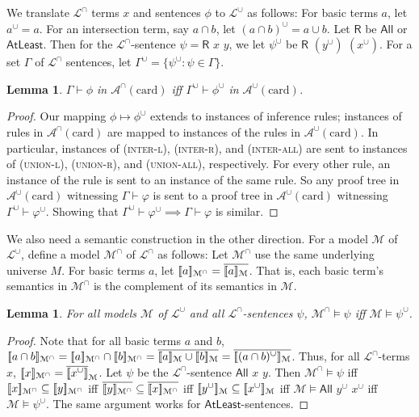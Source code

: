 \documentclass[letterpaper]{article}
\newtheorem{lemma}[theorem]{Lemma}
\theoremstyle{definition}
\newcommand{\semantics}[1]{[\![\mbox{\em $ #1 $\/}]\!]}
\newcommand{\Model}{\mathcal{M}}
\newcommand{\set}[1]{\{ #1 \}}
\newcommand{\proves}{\vdash}
\newcommand{\lang}{\mathcal{L}}
\newcommand{\Aunion}{\mathscr{A}^{\cup}}
\newcommand{\Ainter}{\mathscr{A}^{\cap}}
\newcommand{\proverule}{\textsc}
\newcommand{\unionl}{\proverule{union-l}}
\newcommand{\unionr}{\proverule{union-r}}
\newcommand{\unionall}{\proverule{union-all}}
\newcommand{\interl}{\proverule{inter-l}}
\newcommand{\interr}{\proverule{inter-r}}
\newcommand{\interall}{\proverule{inter-all}}
\newcommand{\All}[2]{\mathsf{All}\,\,#1\,\,#2}
\newcommand{\R}[2]{\mathsf{R}\,\,#1\,\,#2}
\newcommand{\AllNoArgs}{\mathsf{All}}
\newcommand{\AtleastNoArgs}{\mathsf{AtLeast}}
\newcommand{\card}{\mathrm{card}}
\begin{document}
We  translate $\lang^\cap$ terms $x$ and sentences  $\phi$ to $\lang^\cup$ as follows:
 For basic terms $a$, let $a^\cup = a$. 
For an intersection term, say $a \cap b$, let $(a \cap b)^\cup = a \cup b$.  Let 
$\mathsf{R}$  be $\AllNoArgs$ or $\AtleastNoArgs$.
Then for the $\lang^\cap$-sentence
$\psi = \R{x}{y}$, we let     $\psi^\cup$ be  
 $\R{(y^\cup)}{(x^\cup)}$.  For a set $\Gamma$ of $\lang^\cap$ sentences,
 let $\Gamma^\cup = \set{\psi^\cup : \psi\in \Gamma}$.
 


\begin{lemma}
\label{lemma-proof-translation}
$\Gamma\proves\phi$ in $\Ainter(\card)$
iff $\Gamma^\cup\proves\phi^\cup$ in $\Aunion(\card)$.
\end{lemma}
\begin{proof}
Our mapping $\phi\mapsto\phi^\cup$ extends to instances of inference rules; instances of rules in $\Ainter(\card)$ are mapped to instances of the rules in $\Aunion(\card)$. 
In particular, instances of (\interl), (\interr), and (\interall) are sent to instances of (\unionl), (\unionr), and (\unionall), respectively.  For every other rule, an instance of the rule is sent to an instance of the same rule.  So any proof tree in $\Aunion(\card)$ witnessing $\Gamma \proves \varphi$ is sent to a proof tree in $\Aunion(\card)$ witnessing $\Gamma^\cup \proves \varphi^\cup$.  Showing that $\Gamma^\cup \proves \varphi^\cup \implies \Gamma \proves \varphi$ is similar.
\end{proof}


We also need a semantic construction in the other direction.
For a model $\Model$ of $\lang^\cup$, define a model 
 $\Model^\cap$ of $\lang^\cap$ as follows:
Let $\Model^\cap$ use the same underlying universe $M$. 
For basic terms $a$, let $\semantics{a}_{\Model^\cap} = \overline{\semantics{a}_{\Model}}$.  That is, each
basic term's semantics 
in $\Model^\cap$
is the complement of its semantics in $\Model$.



\begin{lemma}
For all  models $\Model$ of $\lang^\cup$ 
and all $\lang^\cap$-sentences $\psi$, 
$\Model^\cap \models \psi$ iff $\Model \models \psi^\cup$.
\label{proposition-union-inter-conversion}
\end{lemma}
\begin{proof}
Note that for all basic terms $a$ and $b$, 
$\semantics{a\cap b}_{\Model^\cap} =\semantics{a}_{\Model^\cap}
\cap \semantics{b}_{\Model^\cap}
=  \overline{\semantics{a}_{\Model}
\cup \semantics{b}_{\Model}  }
=  \overline{\semantics{(a\cap b)^{\cup}}_{\Model}  }
$.
Thus, for all $\lang^\cap$-terms $x$, 
$\semantics{x}_{\Model^\cap} = \overline{\semantics{x^\cup}}_{\Model}$.
Let $\psi$ be the $\lang^\cap$-sentence $\All{x}{y}$.
Then 
$\Model^\cap \models \psi$
iff
$\semantics{x}_{\Model^\cap} \subseteq \semantics{y}_{\Model^\cap}$
iff
$\overline{\semantics{y}_{\Model^\cap}} \subseteq \overline{\semantics{x}_{\Model^\cap}}$
iff
$\semantics{y^\cup}_\Model \subseteq \semantics{x^\cup}_\Model$
iff
$\Model\models\All{y^\cup}{x^\cup}$
iff
$\Model\models\psi^\cup$.
The same argument works for $\AtleastNoArgs$-sentences.
\end{proof}
\end{document}
